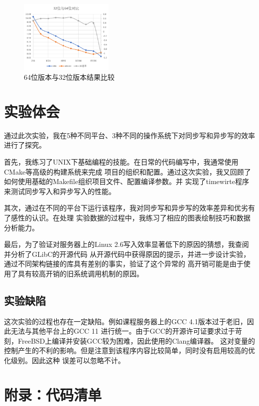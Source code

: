 \documentclass[a4paper,twoside]{article}
\begin{document}
\begin{spacing}{1.2}
\begin{figure}[htb]
	\centering
	\caption{64位版本与32位版本结果比较}
	\label{fig:64bit}
	\includegraphics[width=0.4\textwidth]{64bit.png}
\end{figure}



\section{实验体会}

通过此次实验，我在5种不同平台、3种不同的操作系统下对同步写和异步写的效率进行了探究。

首先，我练习了UNIX下基础编程的技能。在日常的代码编写中，我通常使用CMake等高级的构建系统来完成
项目的组织和配置。通过这次实验，我又回顾了如何使用基础的Makefile组织项目文件、配置编译参数。并
实现了timewirte程序来测试同步写入和异步写入的性能。

其次，通过在不同的平台下运行该程序，我对同步写和异步写的效率差异和优劣有了感性的认识。在处理
实验数据的过程中，我练习了相应的图表绘制技巧和数据分析能力。

最后，为了验证对服务器上的Linux 2.6写入效率显著低下的原因的猜想，我查阅并分析了GLibC的开源代码
从开源代码中获得原因的提示，并进一步设计实验，通过不同架构链接的库具有差别的事实，验证了这个异常的
高开销可能是由于使用了具有较高开销的旧系统调用机制的原因。

\subsection{实验缺陷}

这次实验的过程也存在一定缺陷。例如课程服务器上的GCC 4.1版本过于老旧，因此无法与其他平台上的GCC 11
进行统一。由于GCC的开源许可证要求过于苛刻，FreeBSD上编译并安装GCC较为困难，因此使用的Clang编译器。
这对变量的控制产生的不利的影响。但是注意到该程序内容比较简单，同时没有启用较高的优化级别。因此这种
误差可以忽略不计。

\clearpage
\section*{附录：代码清单}
\label{sec:code}


\end{spacing}
\end{document}
